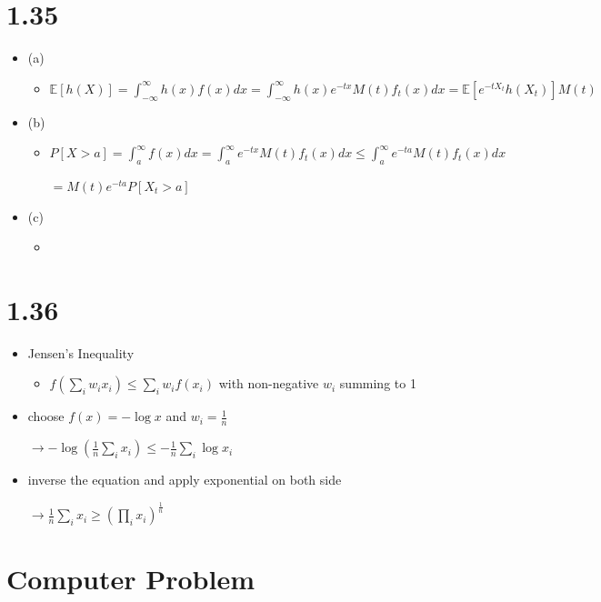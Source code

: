 \documentclass[a4paper]{article}
\begin{document}
\section{1.35}
\begin{itemize}
    \item (a)
        \begin{itemize}
            \item $\mathbb{E}[h(X)] = \int_{-\infty}^\infty h(x) f(x) dx = \int_{-\infty}^\infty h(x) e^{-tx} M(t) f_t(x)dx = \mathbb{E}[e^{-tX_t}h(X_t)] M(t)$
        \end{itemize}
    \item (b)
        \begin{itemize}
            \item $P[X > a] = \int_a^\infty f(x) dx = \int_a^\infty e^{-tx} M(t) f_t(x) dx \leq \int_a^\infty e^{-ta} M(t) f_t(x) dx$

                $= M(t) e^{-ta} P[X_t > a]$
        \end{itemize}
    \item (c)
        \begin{itemize}
            \item 
        \end{itemize}
\end{itemize}

\section{1.36}
\begin{itemize}
    \item Jensen's Inequality
        \begin{itemize}
            \item $f(\sum_i w_i x_i) \leq \sum_i w_i f(x_i)$ with non-negative $w_i$ summing to 1
        \end{itemize}
    \item choose $f(x) = -\log x$ and $w_i = \frac{1}{n}$

        $\rightarrow -\log(\frac{1}{n} \sum_i x_i) \leq - \frac{1}{n} \sum_i \log x_i$
    \item inverse the equation and apply exponential on both side

        $\rightarrow \frac{1}{n} \sum_i x_i \geq (\prod_i x_i)^{\frac{1}{n}}$
\end{itemize}

\section{Computer Problem}
\end{document}

